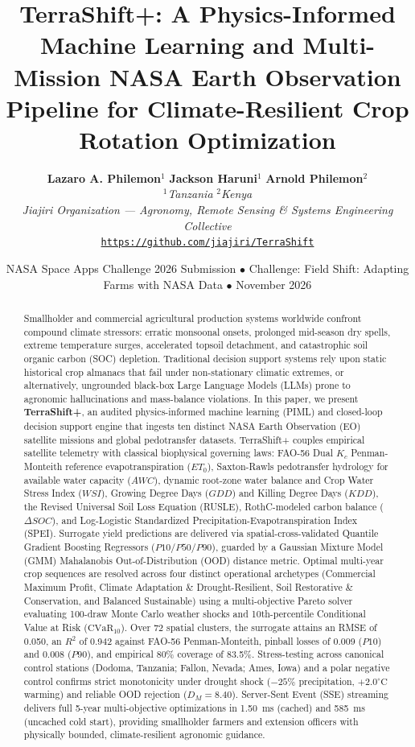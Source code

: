 \documentclass[10pt,twocolumn]{article}
\title{\textbf{\Large TerraShift+: A Physics-Informed Machine Learning and Multi-Mission NASA Earth Observation Pipeline for Climate-Resilient Crop Rotation Optimization}}
\author{
  \textbf{Lazaro A. Philemon}$^{1}$ \quad \textbf{Jackson Haruni}$^{1}$ \quad \textbf{Arnold Philemon}$^{2}$ \\
  $^{1}$\textit{Tanzania} \quad $^{2}$\textit{Kenya} \\
  \textit{Jiajiri Organization --- Agronomy, Remote Sensing \& Systems Engineering Collective} \\
  \href{https://github.com/jiajiri/TerraShift}{\texttt{https://github.com/jiajiri/TerraShift}}
}
\date{\small NASA Space Apps Challenge 2026 Submission $\bullet$ Challenge: Field Shift: Adapting Farms with NASA Data $\bullet$ November 2026}
\begin{document}
\maketitle

\begin{abstract}
\noindent
Smallholder and commercial agricultural production systems worldwide confront compound climate stressors: erratic monsoonal onsets, prolonged mid-season dry spells, extreme temperature surges, accelerated topsoil detachment, and catastrophic soil organic carbon (SOC) depletion. Traditional decision support systems rely upon static historical crop almanacs that fail under non-stationary climatic extremes, or alternatively, ungrounded black-box Large Language Models (LLMs) prone to agronomic hallucinations and mass-balance violations. In this paper, we present \textbf{TerraShift+}, an audited physics-informed machine learning (PIML) and closed-loop decision support engine that ingests ten distinct NASA Earth Observation (EO) satellite missions and global pedotransfer datasets. TerraShift+ couples empirical satellite telemetry with classical biophysical governing laws: FAO-56 Dual $K_c$ Penman-Monteith reference evapotranspiration ($ET_0$), Saxton-Rawls pedotransfer hydrology for available water capacity ($AWC$), dynamic root-zone water balance and Crop Water Stress Index ($WSI$), Growing Degree Days ($GDD$) and Killing Degree Days ($KDD$), the Revised Universal Soil Loss Equation (RUSLE), RothC-modeled carbon balance ($\Delta SOC$), and Log-Logistic Standardized Precipitation-Evapotranspiration Index (SPEI). Surrogate yield predictions are delivered via spatial-cross-validated Quantile Gradient Boosting Regressors ($P10/P50/P90$), guarded by a Gaussian Mixture Model (GMM) Mahalanobis Out-of-Distribution (OOD) distance metric. Optimal multi-year crop sequences are resolved across four distinct operational archetypes (Commercial Maximum Profit, Climate Adaptation \& Drought-Resilient, Soil Restorative \& Conservation, and Balanced Sustainable) using a multi-objective Pareto solver evaluating 100-draw Monte Carlo weather shocks and 10th-percentile Conditional Value at Risk ($\text{CVaR}_{10}$). Over 72 spatial clusters, the surrogate attains an RMSE of 0.050, an $R^2$ of 0.942 against FAO-56 Penman-Monteith, pinball losses of 0.009 ($P10$) and 0.008 ($P90$), and empirical 80\% coverage of 83.5\%. Stress-testing across canonical control stations (Dodoma, Tanzania; Fallon, Nevada; Ames, Iowa) and a polar negative control confirms strict monotonicity under drought shock ($-25\%$ precipitation, $+2.0^\circ\text{C}$ warming) and reliable OOD rejection ($D_M = 8.40$). Server-Sent Event (SSE) streaming delivers full 5-year multi-objective optimizations in 1.50~ms (cached) and 585~ms (uncached cold start), providing smallholder farmers and extension officers with physically bounded, climate-resilient agronomic guidance.
\end{abstract}
\end{document}
